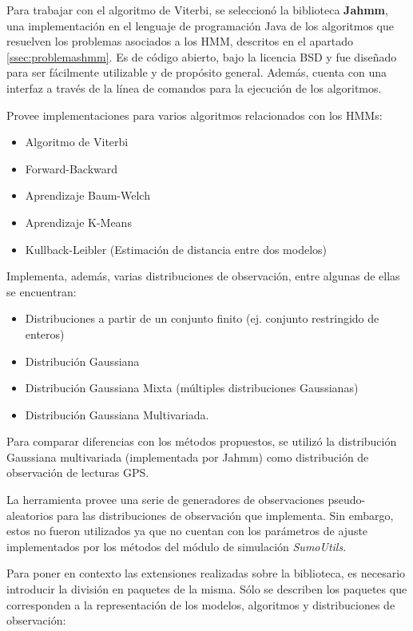Para trabajar con el algoritmo de Viterbi, se seleccionó la biblioteca \textbf{Jahmm}\cite{Jahmm}, una implementación en el lenguaje de programación Java de los algoritmos que resuelven los problemas asociados a los HMM, descritos en el apartado \ref{ssec:problemashmm}. Es de código abierto, bajo la licencia BSD y fue diseñado para ser fácilmente utilizable y de propósito general. Además, cuenta con una interfaz a través de la línea de comandos para la ejecución de los algoritmos.

Provee implementaciones para varios algoritmos relacionados con los HMMs:

\begin{itemize}
\item Algoritmo de Viterbi 
\item Forward-Backward
\item Aprendizaje Baum-Welch
\item Aprendizaje K-Means
\item Kullback-Leibler (Estimación de distancia entre dos modelos)
\end{itemize}

Implementa, además, varias distribuciones de observación, entre algunas de ellas se encuentran: 

\begin{itemize}
\item Distribuciones a partir de un conjunto finito (ej. conjunto restringido de enteros)
\item Distribución Gaussiana
\item Distribución Gaussiana Mixta (múltiples distribuciones Gaussianas)
\item Distribución Gaussiana Multivariada.
\end{itemize}

Para comparar diferencias con los métodos propuestos, se utilizó la distribución Gaussiana multivariada (implementada por Jahmm) como distribución de observación de lecturas GPS. 

La herramienta provee una serie de generadores de observaciones pseudo-aleatorios para las distribuciones de observación que implementa. Sin embargo, estos no fueron utilizados ya que no cuentan con los parámetros de ajuste implementados por los métodos del módulo de simulación \textit{SumoUtils}.

Para poner en contexto las extensiones realizadas sobre la biblioteca, es necesario introducir la división en paquetes de la misma. Sólo se describen los paquetes que corresponden a la representación de los modelos, algoritmos y distribuciones de observación:

